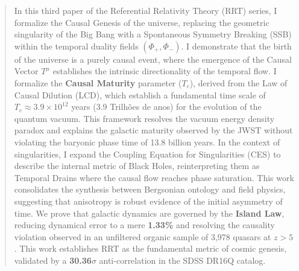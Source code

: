 \documentclass[12pt, a4paper]{article}
\begin{document}
\thispagestyle{empty}
\vspace*{\fill}
\begin{abstract}
\noindent In this third paper of the Referential Relativity Theory (RRT) series, I formalize the Causal Genesis of the universe, replacing the geometric singularity of the Big Bang with a Spontaneous Symmetry Breaking (SSB) within the temporal duality fields \((\Phi_{+}, \Phi_{-})\). I demonstrate that the birth of the universe is a purely causal event, where the emergence of the Causal Vector \(T^{\mu}\) establishes the intrinsic directionality of the temporal flow. I formalize the \textbf{Causal Maturity} parameter (\(T_c\)), derived from the Law of Causal Dilution (LCD), which establish a fundamental time scale of $T_c \approx 3.9 \times 10^{12}$ years (3.9 Trilhões de anos) for the evolution of the quantum vacuum. This framework resolves the vacuum energy density paradox and explains the galactic maturity observed by the JWST without violating the baryonic phase time of 13.8 billion years. In the context of singularities, I expand the Coupling Equation for Singularities (CES) to describe the internal metric of Black Holes, reinterpreting them as Temporal Drains where the causal flow reaches phase saturation. This work consolidates the synthesis between Bergsonian ontology and field physics, suggesting that anisotropy is robust evidence of the initial asymmetry of time. We prove that galactic dynamics are governed by the \textbf{Island Law}, reducing dynamical error to a mere \textbf{1.33\%} and resolving the causality violation observed in an unfiltered organic sample of 3,978 quasars at $z > 5$. This work establishes RRT as the fundamental metric of cosmic genesis, validated by a \textbf{30.36$\sigma$} anti-correlation in the SDSS DR16Q catalog.
\end{abstract}

\vspace{1.0cm}
\end{document}

